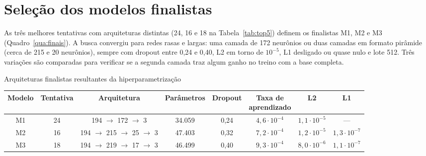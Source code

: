 \section{Seleção dos modelos finalistas}
\label{sec:finalistas}

As três melhores tentativas com arquiteturas distintas (24, 16 e 18 na Tabela~\ref{tab:top5}) definem os finalistas M1, M2 e M3 (Quadro~\ref{qua:finais}). A busca convergiu para redes rasas e largas: uma camada de 172 neurônios ou duas camadas em formato pirâmide (cerca de 215 e 20 neurônios), sempre com dropout entre 0,24 e 0,40, L2 em torno de $10^{-5}$, L1 desligado ou quase nulo e lote 512. Três variações são comparadas para verificar se a segunda camada traz algum ganho no treino com a base completa.

\begin{quadro}[!htbp]
\caption{Arquiteturas finalistas resultantes da hiperparametrização}
\label{qua:finais}
\begin{center}
\scriptsize
\setlength{\tabcolsep}{4pt}
\begin{tabular}{|c|c|c|c|c|c|c|c|}
\hline
\textbf{Modelo} & \textbf{Tentativa} & \textbf{Arquitetura} & \textbf{Parâmetros} & \textbf{Dropout} & \makecell{\textbf{Taxa de}\\\textbf{aprendizado}} & \textbf{L2} & \textbf{L1} \\ \hline
M1 & 24 & 194 $\rightarrow$ 172 $\rightarrow$ 3 & 34.059 & 0,24 & $4{,}6 \cdot 10^{-4}$ & $1{,}1 \cdot 10^{-5}$ & --- \\ \hline
M2 & 16 & 194 $\rightarrow$ 215 $\rightarrow$ 25 $\rightarrow$ 3 & 47.403 & 0,32 & $7{,}2 \cdot 10^{-4}$ & $1{,}2 \cdot 10^{-5}$ & $1{,}3 \cdot 10^{-7}$ \\ \hline
M3 & 18 & 194 $\rightarrow$ 219 $\rightarrow$ 17 $\rightarrow$ 3 & 46.499 & 0,40 & $9{,}3 \cdot 10^{-4}$ & $8{,}0 \cdot 10^{-6}$ & $1{,}1 \cdot 10^{-7}$ \\ \hline
\end{tabular}
\end{center}
\end{quadro}
